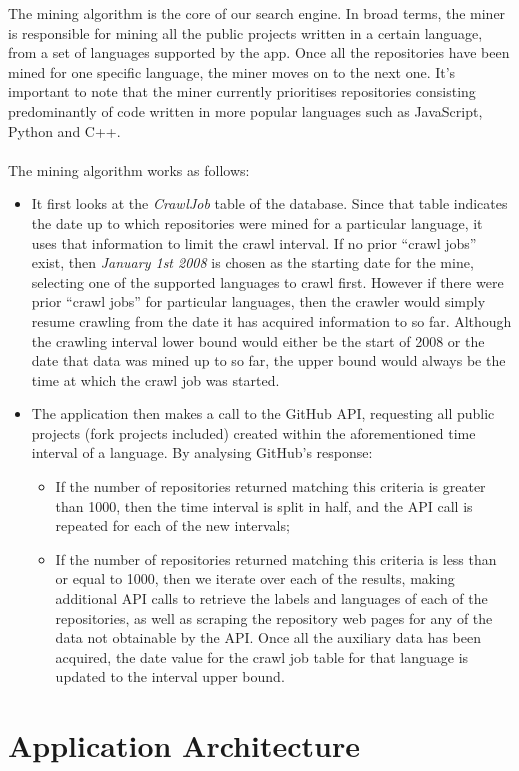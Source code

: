 The mining algorithm is the core of our search engine.
In broad terms, the miner is responsible for mining all the public projects written in a certain language, from a set of languages supported by the app.
Once all the repositories have been mined for one specific language, the miner moves on to the next one.
It's important to note that the miner currently prioritises repositories consisting predominantly of code written in more popular languages such as JavaScript, Python and C++.
\\\\
\noindent
The mining algorithm works as follows:
\begin{itemize}
    \item It first looks at the \textit{CrawlJob} table of the database. Since that table indicates the date up to which repositories were mined for a particular language, it uses that information to limit the crawl interval. If no prior ``crawl jobs'' exist, then \textit{January 1st 2008} is chosen as the starting date for the mine, selecting one of the supported languages to crawl first. However if there were prior ``crawl jobs'' for particular languages, then the crawler would simply resume crawling from the date it has acquired information to so far. Although the crawling interval lower bound would either be the start of 2008 or the date that data was mined up to so far, the upper bound would always be the time at which the crawl job was started.
    \item The application then makes a call to the GitHub API, requesting all public projects (fork projects included) created within the aforementioned time interval of a language. By analysing GitHub's response:
    \begin{itemize}
        \item If the number of repositories returned matching this criteria is greater than 1000, then the time interval is split in half, and the API call is repeated for each of the new intervals;
        \item If the number of repositories returned matching this criteria is less than or equal to 1000, then we iterate over each of the results, making additional API calls to retrieve the labels and languages of each of the repositories, as well as scraping the repository web pages for any of the data not obtainable by the API\@. Once all the auxiliary data has been acquired, the date value for the crawl job table for that language is updated to the interval upper bound.
    \end{itemize}
\end{itemize}

\section{Application Architecture}